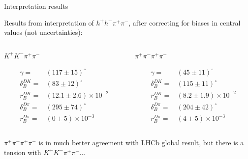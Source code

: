 \documentclass{beamer}
\begin{document}
\begin{frame}{Interpretation results}
  \begin{center}
    {\large Results from interpretation of $h^+h^-\pi^+\pi^-$, after correcting for biases in central values (not uncertainties):}
  \end{center}
  \vspace{-0.5cm}
  \begin{columns}
    \begin{column}{0.5\textwidth}
      \begin{center}
        $K^+K^-\pi^+\pi^-$
      \end{center}
      \begin{align*}
        \gamma =& (117 \pm 15)^\circ \\
        \delta_B^{DK} =& (83 \pm 12)^\circ \\
        r_B^{DK} =& (12.1 \pm 2.6)\times10^{-2} \\
        \delta_B^{D\pi} =& (295 \pm 74)^\circ \\
        r_B^{D\pi} =& (0 \pm 5)\times10^{-3}
      \end{align*}
    \end{column}
    \begin{column}{0.5\textwidth}
      \begin{center}
        $\pi^+\pi^-\pi^+\pi^-$
      \end{center}
      \begin{align*}
        \gamma =& (45 \pm 11)^\circ \\
        \delta_B^{DK} =& (115 \pm 11)^\circ \\
        r_B^{DK} =& (8.2 \pm 1.9)\times10^{-2} \\
        \delta_B^{D\pi} =& (204 \pm 42)^\circ \\
        r_B^{D\pi} =& (4 \pm 5)\times10^{-3}
      \end{align*}
    \end{column}
  \end{columns}
  \vspace{0.3cm}
  \begin{center}
    $\pi^+\pi^-\pi^+\pi^-$ is in much better agreement with LHCb global result, but there is a tension with $K^+K^-\pi^+\pi^-$...\\
    \phantom{...but how Gaussian are these uncertainties?}
  \end{center}
\end{frame}
\end{document}
